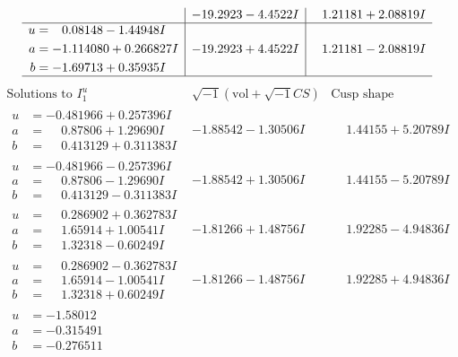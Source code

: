 \documentclass[1p]{elsarticle_modified}
\theoremstyle{definition}
\newcommand{\I}{\sqrt{-1}}
\begin{document}
$$\begin{array}{c|c|c}
 & -19.2923 - 4.4522 I & \phantom{-}1.21181 + 2.08819 I \\ \hline\begin{aligned}
u &= \phantom{-}0.08148 - 1.44948 I \\
a &= -1.114080 + 0.266827 I \\
b &= -1.69713 + 0.35935 I\end{aligned}
 & -19.2923 + 4.4522 I & \phantom{-}1.21181 - 2.08819 I\\
 \hline 
 \end{array}$$\newpage$$\begin{array}{c|c|c}  
\text{Solutions to }I^u_{1}& \I (\text{vol} + \sqrt{-1}CS) & \text{Cusp shape}\\
 \hline 
\begin{aligned}
u &= -0.481966 + 0.257396 I \\
a &= \phantom{-}0.87806 + 1.29690 I \\
b &= \phantom{-}0.413129 + 0.311383 I\end{aligned}
 & -1.88542 - 1.30506 I & \phantom{-}1.44155 + 5.20789 I \\ \hline\begin{aligned}
u &= -0.481966 - 0.257396 I \\
a &= \phantom{-}0.87806 - 1.29690 I \\
b &= \phantom{-}0.413129 - 0.311383 I\end{aligned}
 & -1.88542 + 1.30506 I & \phantom{-}1.44155 - 5.20789 I \\ \hline\begin{aligned}
u &= \phantom{-}0.286902 + 0.362783 I \\
a &= \phantom{-}1.65914 + 1.00541 I \\
b &= \phantom{-}1.32318 - 0.60249 I\end{aligned}
 & -1.81266 + 1.48756 I & \phantom{-}1.92285 - 4.94836 I \\ \hline\begin{aligned}
u &= \phantom{-}0.286902 - 0.362783 I \\
a &= \phantom{-}1.65914 - 1.00541 I \\
b &= \phantom{-}1.32318 + 0.60249 I\end{aligned}
 & -1.81266 - 1.48756 I & \phantom{-}1.92285 + 4.94836 I \\ \hline\begin{aligned}
u &= -1.58012\phantom{ +0.000000I} \\
a &= -0.315491\phantom{ +0.000000I} \\
b &= -0.276511\phantom{ +0.000000I}\end{aligned}

\end{array}$$
\end{document}
